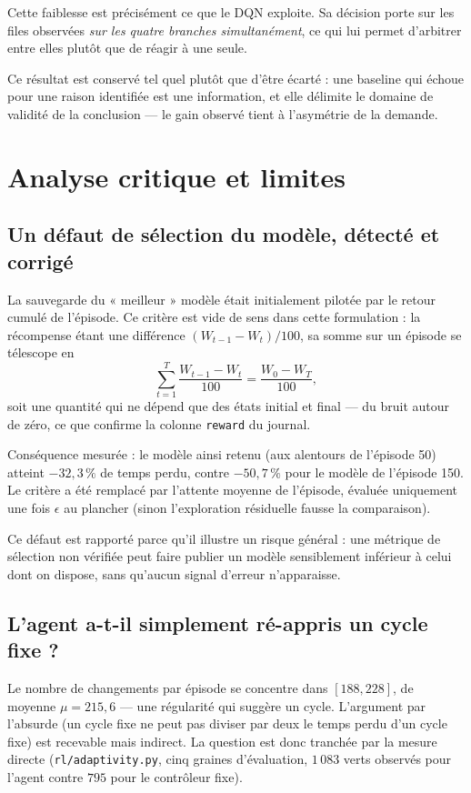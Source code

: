 \documentclass[11pt,a4paper]{article}
\begin{document}
Cette faiblesse est précisément ce que le DQN exploite. Sa décision porte sur les
files observées \emph{sur les quatre branches simultanément}, ce qui lui permet
d'arbitrer entre elles plutôt que de réagir à une seule.

Ce résultat est conservé tel quel plutôt que d'être écarté : une baseline qui échoue
pour une raison identifiée est une information, et elle délimite le domaine de
validité de la conclusion --- le gain observé tient à l'asymétrie de la demande.

\section{Analyse critique et limites}

\subsection{Un défaut de sélection du modèle, détecté et corrigé}

La sauvegarde du « meilleur » modèle était initialement pilotée par le retour cumulé
de l'épisode. Ce critère est vide de sens dans cette formulation : la récompense
étant une différence $(W_{t-1} - W_t)/100$, sa somme sur un épisode se télescope en
\[
\sum_{t=1}^{T} \frac{W_{t-1} - W_t}{100} = \frac{W_0 - W_T}{100},
\]
soit une quantité qui ne dépend que des états initial et final --- du bruit autour de
zéro, ce que confirme la colonne \texttt{reward} du journal.

Conséquence mesurée : le modèle ainsi retenu (aux alentours de l'épisode 50) atteint
$-32{,}3\,\%$ de temps perdu, contre $-50{,}7\,\%$ pour le modèle de l'épisode 150.
Le critère a été remplacé par l'attente moyenne de l'épisode, évaluée uniquement une
fois $\epsilon$ au plancher (sinon l'exploration résiduelle fausse la comparaison).

Ce défaut est rapporté parce qu'il illustre un risque général : une métrique de
sélection non vérifiée peut faire publier un modèle sensiblement inférieur à celui
dont on dispose, sans qu'aucun signal d'erreur n'apparaisse.

\subsection{L'agent a-t-il simplement ré-appris un cycle fixe ?}
\label{sec:adaptivite}

Le nombre de changements par épisode se concentre dans $[188, 228]$, de moyenne
$\mu = 215{,}6$ --- une régularité qui suggère un cycle. L'argument par l'absurde
(un cycle fixe ne peut pas diviser par deux le temps perdu d'un cycle fixe) est
recevable mais indirect. La question est donc tranchée par la mesure directe
(\texttt{rl/adaptivity.py}, cinq graines d'évaluation, $1\,083$ verts observés pour
l'agent contre $795$ pour le contrôleur fixe).
\end{document}
